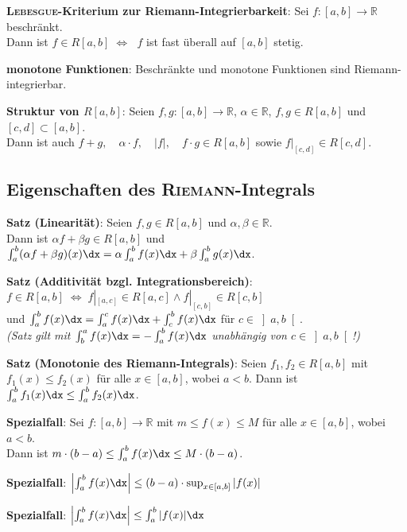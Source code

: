\textbf{\textsc{Lebesgue}-Kriterium zur Riemann-Integrierbarkeit}:
Sei $f: [a,b] \rightarrow \mathbb{R}$ beschränkt. \\
Dann ist $f \in R[a,b] \;\Leftrightarrow\;$
$f$ ist fast überall auf $[a,b]$ stetig.

\textbf{monotone Funktionen}:
Beschränkte und monotone Funktionen sind Riemann-integrierbar.

\textbf{Struktur von $R[a,b]$}:
Seien $f, g: [a,b] \rightarrow \mathbb{R}$,
$\alpha \in \mathbb{R}$,
$f, g \in R[a,b]$ und
$[c,d] \subset [a,b]$. \\
Dann ist auch $f + g,\quad \alpha \cdot f,\quad |f|,\quad f \cdot g \in R[a,b]$
sowie $f|_{[c,d]} \in R[c,d]$.

\subsection{%
    Eigenschaften des \textsc{Riemann}-Integrals%
}

\textbf{Satz (Linearität)}:
Seien $f, g \in R[a,b]$ und $\alpha, \beta \in \mathbb{R}$. \\
Dann ist $\alpha f + \beta g \in R[a,b]$ und
$\int_a^b (\alpha f + \beta g)(x)\dx =
\alpha \int_a^b f(x)\dx + \beta \int_a^b g(x)\dx$.

\textbf{Satz (Additivität bzgl. Integrationsbereich)}: \\
$f \in R[a,b] \;\Leftrightarrow\;
f|_{[a,c]} \in R[a,c] \land f|_{[c,b]} \in R[c,b]$ \\
und $\int_a^b f(x)\dx = \int_a^c f(x)\dx + \int_c^b f(x)\dx$
für $c \in \left]a,b\right[$. \\
\emph{(Satz gilt mit $\int_b^a f(x)\dx = -\int_a^b f(x)\dx$ unabhängig von
$c \in \left]a,b\right[$!)}

\textbf{Satz (Monotonie des Riemann-Integrals)}:
Seien $f_1, f_2 \in R[a,b]$ mit $f_1(x) \le f_2(x)$ für alle $x \in [a,b]$,
wobei $a < b$. \qquad
Dann ist $\int_a^b f_1(x)\dx \le \int_a^b f_2(x)\dx$.

\textbf{Spezialfall}:
Sei $f: [a,b] \rightarrow \mathbb{R}$ mit $m \le f(x) \le M$ für alle
$x \in [a,b]$, wobei $a < b$. \\
Dann ist $m \cdot (b - a) \le \int_a^b f(x)\dx \le M \cdot (b - a)$.

\textbf{Spezialfall}:
$\left|\int_a^b f(x)\dx\right| \le (b - a) \cdot \sup_{x \in [a,b]} |f(x)|$

\textbf{Spezialfall}:
$\left|\int_a^b f(x)\dx\right| \le \int_a^b |f(x)|\dx$

